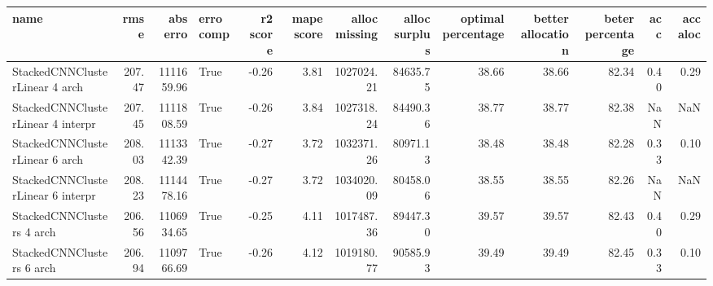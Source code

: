\begin{tabular}{lrrlrrrrrrrrr}
\toprule
name & rmse & abs erro & erro comp & r2 score & mape score & alloc missing & alloc surplus & optimal percentage & better allocation & beter percentage & acc & acc aloc \\
\midrule
StackedCNNClusterLinear 4 arch & 207.47 & 1111659.96 & True & -0.26 & 3.81 & 1027024.21 & 84635.75 & 38.66 & 38.66 & 82.34 & 0.40 & 0.29 \\
StackedCNNClusterLinear 4 interpr & 207.45 & 1111808.59 & True & -0.26 & 3.84 & 1027318.24 & 84490.36 & 38.77 & 38.77 & 82.38 & NaN & NaN \\
StackedCNNClusterLinear 6 arch & 208.03 & 1113342.39 & True & -0.27 & 3.72 & 1032371.26 & 80971.13 & 38.48 & 38.48 & 82.28 & 0.33 & 0.10 \\
StackedCNNClusterLinear 6 interpr & 208.23 & 1114478.16 & True & -0.27 & 3.72 & 1034020.09 & 80458.06 & 38.55 & 38.55 & 82.26 & NaN & NaN \\
StackedCNNClusters 4 arch & 206.56 & 1106934.65 & True & -0.25 & 4.11 & 1017487.36 & 89447.30 & 39.57 & 39.57 & 82.43 & 0.40 & 0.29 \\
StackedCNNClusters 6 arch & 206.94 & 1109766.69 & True & -0.26 & 4.12 & 1019180.77 & 90585.93 & 39.49 & 39.49 & 82.45 & 0.33 & 0.10 \\
\bottomrule
\end{tabular}
